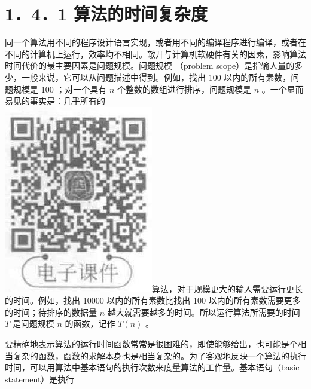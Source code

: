 \documentclass[10pt]{article}
\begin{document}
\section*{1．4．1 算法的时间复杂度}
同一个算法用不同的程序设计语言实现，或者用不同的编译程序进行编译，或者在不同的计算机上运行，效率均不相同。敵开与计算机软硬件有关的因素，影响算法时间代价的最主要因素是问题规模。问题规模 （problem scope）是指输人量的多少，一般来说，它可以从问题描述中得到。例如，找出 100 以内的所有素数，问题规模是 100 ；对一个具有 $n$ 个整数的数组进行排序，问题规模是 $n$ 。一个显而易见的事实是：几乎所有的\\
\includegraphics[max width=\textwidth]{2025_06_06_704745ea57b15b2333e5g-029}算法，对于规模更大的输人需要运行更长的时间。例如，找出 10000 以内的所有素数比找出 100 以内的所有素数需要更多的时间；待排序的数据量 $n$ 越大就需要越多的时间。所以运行算法所需要的时间 $T$ 是问题规模 $n$ 的函数，记作 $T(n)$ 。

要精确地表示算法的运行时间函数常常是很困难的，即使能够给出，也可能是个相当复杂的函数，函数的求解本身也是相当复杂的。为了客观地反映一个算法的执行时间，可以用算法中基本语句的执行次数来度量算法的工作量。基本语句（basic statement）是执行
\end{document}
